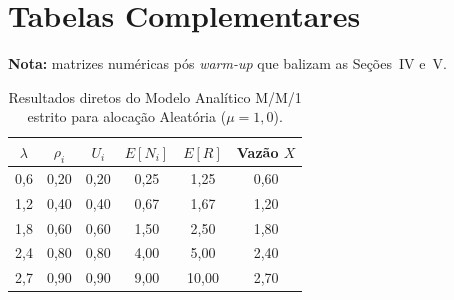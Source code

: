 \documentclass[conference]{IEEEtran}
\begin{document}
\appendices
\section{Tabelas Complementares}
\noindent\textbf{Nota:} matrizes numéricas pós \textit{warm-up} que balizam as Seções~IV e~V.

\begin{table}[!t]
\centering
\caption{Resultados diretos do Modelo Analítico M/M/1 estrito para alocação Aleatória ($\mu=1{,}0$).}
\label{tab:analitico}
\small
\begin{tabular}{@{}cccccc@{}}
\toprule
$\lambda$ & $\rho_i$ & $U_i$ & $E[N_i]$ & $E[R]$ & Vazão $X$ \\
\midrule
0,6 & 0,20 & 0,20 & 0,25 & 1,25 & 0,60 \\
1,2 & 0,40 & 0,40 & 0,67 & 1,67 & 1,20 \\
1,8 & 0,60 & 0,60 & 1,50 & 2,50 & 1,80 \\
2,4 & 0,80 & 0,80 & 4,00 & 5,00 & 2,40 \\
2,7 & 0,90 & 0,90 & 9,00 & 10,00 & 2,70 \\
\bottomrule
\end{tabular}
\end{table}
\end{document}
